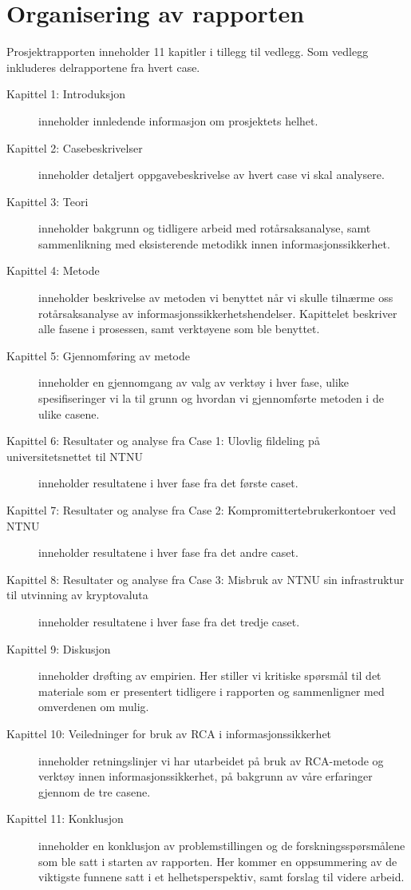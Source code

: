 \section{Organisering av rapporten}
\label{sec:organisering_rapport}
Prosjektrapporten inneholder 11 kapitler i tillegg til vedlegg. Som vedlegg inkluderes delrapportene fra hvert case. 


\begin{description}
    \item [Kapittel 1: Introduksjon] inneholder innledende informasjon om prosjektets helhet.
    
    \item [Kapittel 2: Casebeskrivelser] inneholder detaljert oppgavebeskrivelse av hvert case vi skal analysere.
    
    \item [Kapittel 3: Teori] inneholder bakgrunn og tidligere arbeid med rotårsaksanalyse, samt sammenlikning med eksisterende metodikk innen informasjonssikkerhet.
    
    \item [Kapittel 4: Metode] inneholder beskrivelse av metoden vi benyttet når vi skulle tilnærme oss rotårsaksanalyse av informasjonssikkerhetshendelser. Kapittelet beskriver alle fasene i prosessen, samt verktøyene som ble benyttet. 
    
    \item [Kapittel 5: Gjennomføring av metode] inneholder en gjennomgang av valg av verktøy i hver fase, ulike spesifiseringer vi la til grunn og hvordan vi gjennomførte metoden i de ulike casene. 
    
    \item [Kapittel 6: Resultater og analyse fra Case 1: Ulovlig fildeling på universitetsnettet til NTNU] inneholder resultatene i hver fase fra det første caset.
    
    \item [Kapittel 7: Resultater og analyse fra Case 2: Kompromittertebrukerkontoer ved NTNU] inneholder resultatene i hver fase fra det andre caset.
    
    \item [Kapittel 8: Resultater og analyse fra Case 3: Misbruk av NTNU sin infrastruktur til utvinning av kryptovaluta] inneholder resultatene i hver fase fra det tredje caset.
    
    \item [Kapittel 9: Diskusjon] inneholder drøfting av empirien. Her stiller vi kritiske spørsmål til det materiale som er presentert tidligere i rapporten og sammenligner med omverdenen om mulig. 
    
    \item [Kapittel 10: Veiledninger for bruk av RCA i informasjonssikkerhet] inneholder retningslinjer vi har utarbeidet på bruk av RCA-metode og verktøy innen informasjonssikkerhet, på bakgrunn av våre erfaringer gjennom de tre casene. 
    
    \item [Kapittel 11: Konklusjon] inneholder en konklusjon av problemstillingen og de forskningsspørsmålene som ble satt i starten av rapporten. Her kommer en oppsummering av de viktigste funnene satt i et helhetsperspektiv, samt forslag til videre arbeid. 
\end{description}